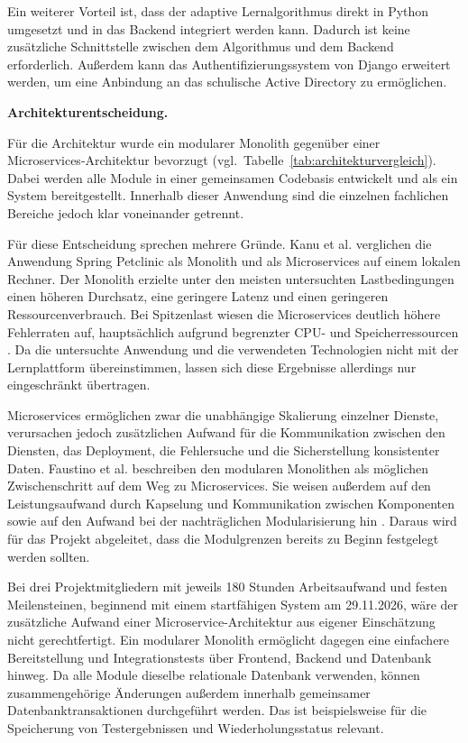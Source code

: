 Ein weiterer Vorteil ist, dass der adaptive Lernalgorithmus direkt in Python umgesetzt und in das Backend integriert werden kann. Dadurch ist keine zusätzliche Schnittstelle zwischen dem Algorithmus und dem Backend erforderlich. Außerdem kann das Authentifizierungssystem von Django erweitert werden, um eine Anbindung an das schulische Active Directory zu ermöglichen.

\textbf{Architekturentscheidung.}

Für die Architektur wurde ein modularer Monolith gegenüber einer Microservices-Architektur bevorzugt (vgl.~Tabelle~\ref{tab:architekturvergleich}). Dabei werden alle Module in einer gemeinsamen Codebasis entwickelt und als ein System bereitgestellt. Innerhalb dieser Anwendung sind die einzelnen fachlichen Bereiche jedoch klar voneinander getrennt.

Für diese Entscheidung sprechen mehrere Gründe. Kanu et al. verglichen die Anwendung Spring Petclinic als Monolith und als Microservices auf einem lokalen Rechner. Der Monolith erzielte unter den meisten untersuchten Lastbedingungen einen höheren Durchsatz, eine geringere Latenz und einen geringeren Ressourcenverbrauch. Bei Spitzenlast wiesen die Microservices deutlich höhere Fehlerraten auf, hauptsächlich aufgrund begrenzter CPU- und Speicherressourcen \parencite{zenodo2025petclinic}. Da die untersuchte Anwendung und die verwendeten Technologien nicht mit der Lernplattform übereinstimmen, lassen sich diese Ergebnisse allerdings nur eingeschränkt übertragen.

Microservices ermöglichen zwar die unabhängige Skalierung einzelner Dienste, verursachen jedoch zusätzlichen Aufwand für die Kommunikation zwischen den Diensten, das Deployment, die Fehlersuche und die Sicherstellung konsistenter Daten. Faustino et al. beschreiben den modularen Monolithen als möglichen Zwischenschritt auf dem Weg zu Microservices. Sie weisen außerdem auf den Leistungsaufwand durch Kapselung und Kommunikation zwischen Komponenten sowie auf den Aufwand bei der nachträglichen Modularisierung hin \parencite{faustino2022}. Daraus wird für das Projekt abgeleitet, dass die Modulgrenzen bereits zu Beginn festgelegt werden sollten.

Bei drei Projektmitgliedern mit jeweils 180 Stunden Arbeitsaufwand und festen Meilensteinen, beginnend mit einem startfähigen System am 29.11.2026, wäre der zusätzliche Aufwand einer Microservice-Architektur aus eigener Einschätzung nicht gerechtfertigt. Ein modularer Monolith ermöglicht dagegen eine einfachere Bereitstellung und Integrationstests über Frontend, Backend und Datenbank hinweg. Da alle Module dieselbe relationale Datenbank verwenden, können zusammengehörige Änderungen außerdem innerhalb gemeinsamer Datenbanktransaktionen durchgeführt werden. Das ist beispielsweise für die Speicherung von Testergebnissen und Wiederholungsstatus relevant.

